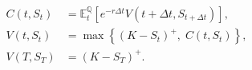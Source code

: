 \documentclass{equation-sheet}
\begin{document}
\begin{equation*}
\begin{aligned}
C(t,S_t)
  &= \mathbb{E}^{\mathbb{Q}}_t\!\left[
      e^{-r\Delta t}V(t+\Delta t,S_{t+\Delta t})
    \right], \\[0.5em]
V(t,S_t)
  &= \max\!\left\{(K-S_t)^{+},\;C(t,S_t)\right\}, \\[0.5em]
V(T,S_T) &= (K-S_T)^{+}.
\end{aligned}
\end{equation*}
\end{document}
